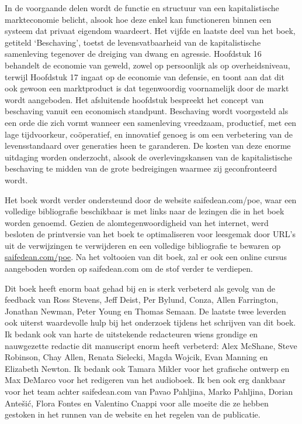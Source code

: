 In de voorgaande delen wordt de functie en structuur van een kapitalistische markteconomie belicht, alsook hoe deze enkel kan functioneren binnen een systeem dat privaat eigendom waardeert. Het vijfde en laatste deel van het boek, getiteld `Beschaving', toetst de levensvatbaarheid van de kapitalistische samenleving tegenover de dreiging van dwang en agressie. Hoofdstuk 16 behandelt de economie van geweld, zowel op persoonlijk als op overheidsniveau, terwijl Hoofdstuk 17 ingaat op de economie van defensie, en toont aan dat dit ook gewoon een marktproduct is dat tegenwoordig voornamelijk door de markt wordt aangeboden. Het afsluitende hoofdstuk bespreekt het concept van beschaving vanuit een economisch standpunt. Beschaving wordt voorgesteld als een orde die zich vormt wanneer een samenleving vreedzaam, productief, met een lage tijdvoorkeur, coöperatief, en innovatief genoeg is om een verbetering van de levensstandaard over generaties heen te garanderen. De kosten van deze enorme uitdaging worden onderzocht, alsook de overlevingskansen van de kapitalistische beschaving te midden van de grote bedreigingen waarmee zij geconfronteerd wordt.

Het boek wordt verder ondersteund door de website saifedean.com/poe, waar een volledige bibliografie beschikbaar is met links naar de lezingen die in het boek worden genoemd. Gezien de alomtegenwoordigheid van het internet, werd besloten de printversie van het boek te optimaliseren voor leesgemak door URL's uit de verwijzingen te verwijderen en een volledige bibliografie te bewaren op \href{saifedean.com/poe}{saifedean.com/poe}. Na het voltooien van dit boek, zal er ook een online cursus aangeboden worden op saifedean.com om de stof verder te verdiepen.

Dit boek heeft enorm baat gehad bij en is sterk verbeterd als gevolg van de feedback van Ross Stevens, Jeff Deist, Per Bylund, Conza, Allen Farrington, Jonathan Newman, Peter Young en Thomas Semaan. De laatste twee leverden ook uiterst waardevolle hulp bij het onderzoek tijdens het schrijven van dit boek. Ik bedank ook van harte de uitstekende redacteuren wiens grondige en nauwgezette redactie dit manuscript enorm heeft verbeterd: Alex McShane, Steve Robinson, Chay Allen, Renata Sielecki, Magda Wojcik, Evan Manning en Elizabeth Newton. Ik bedank ook Tamara Mikler voor het grafische ontwerp en Max DeMarco voor het redigeren van het audioboek. Ik ben ook erg dankbaar voor het team achter saifedean.com van Pavao Pahljina, Marko Pahljina, Dorian Antešić, Flora Fontes en Valentino Cnappi voor alle moeite die ze hebben gestoken in het runnen van de website en het regelen van de publicatie.

